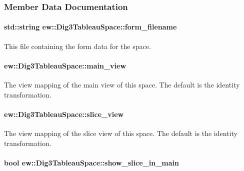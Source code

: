 \subsubsection{Member Data Documentation}
\hypertarget{classew_1_1Dig3TableauSpace_adcdd8967b3b7217b151e30bf1c2540b1}{
\paragraph[{form\_\-filename}]{\setlength{\rightskip}{0pt plus 5cm}std::string {\bf ew::Dig3TableauSpace::form\_\-filename}}\hfill}
\label{classew_1_1Dig3TableauSpace_adcdd8967b3b7217b151e30bf1c2540b1}
This file containing the form data for the space. \hypertarget{classew_1_1Dig3TableauSpace_aeed5fbdecb68a567bdcb204cf954be6e}{
\paragraph[{main\_\-view}]{ {\bf ew::Dig3TableauSpace::main\_\-view}}\hfill}
\label{classew_1_1Dig3TableauSpace_aeed5fbdecb68a567bdcb204cf954be6e}
The view mapping of the main view of this space. The default is the identity transformation. \hypertarget{classew_1_1Dig3TableauSpace_aaf9b84f70f9ab0db2d775e60d2d70a74}{
\paragraph[{slice\_\-view}]{ {\bf ew::Dig3TableauSpace::slice\_\-view}}\hfill}
\label{classew_1_1Dig3TableauSpace_aaf9b84f70f9ab0db2d775e60d2d70a74}
The view mapping of the slice view of this space. The default is the identity transformation. \hypertarget{classew_1_1Dig3TableauSpace_a8c8a902e9e636bffc8638c8105b3b5b4}{
\paragraph[{show\_\-slice\_\-in\_\-main}]{\setlength{\rightskip}{0pt plus 5cm}bool {\bf ew::Dig3TableauSpace::show\_\-slice\_\-in\_\-main}}\hfill}
